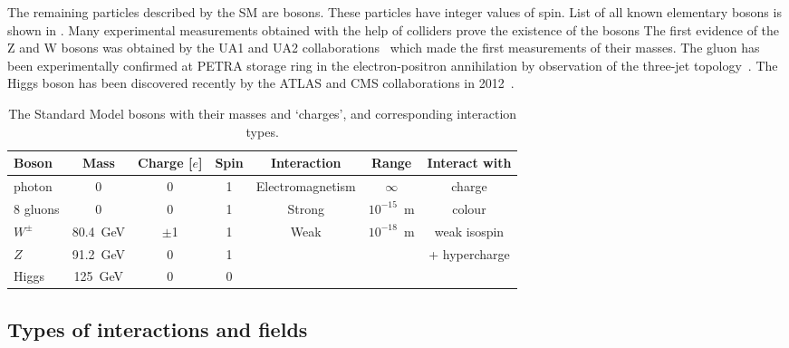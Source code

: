 The remaining particles described by the SM are bosons. These particles have integer values of spin.
List of all known elementary bosons is shown in .
Many experimental measurements obtained with the help of colliders prove the existence of the bosons
The first evidence of the Z and W bosons was obtained by the UA1 and UA2 collaborations~\cite{ARNISON1983103, BAGNAIA1983130}
which made the first measurements of their masses.
The gluon has been experimentally confirmed at PETRA storage ring in the electron-positron annihilation by observation of the three-jet topology~\cite{three_jet_event}.
The Higgs boson has been discovered recently by the ATLAS and CMS collaborations in 2012~\cite{Aad2012tfa, Chatrchyan2012ufa}.

\begin{table}[h!]
\begin{center}
{
\begin{tabular}{|l|c|c|c|c|c|c|}\cline{1-7}
 Boson & Mass &  Charge [$e$] & Spin  & Interaction & Range & Interact with \\ \hline
    photon  &  0  &  0 & 1 &  Electromagnetism & $ \infty $  &  charge \\ \hline
  8 gluons  &  0  &  0 & 1 &  Strong & $10^{-15}$~m &  colour \\ \hline 
    $W^{\pm}$   &  80.4~GeV  &  $\pm$1 & 1 &  \multirow{2}{*}{Weak}  & \multirow{2}{*}{$10^{-18}$~m} & weak isospin  \\
    $Z$   &  91.2~GeV  &  0 & 1 &  &  & + hypercharge \\ \hline
    Higgs   &  125~GeV  &  0 & 0 &  &  &   \\ 
\hline
\end{tabular}
}
\caption{\label{tab:bosons}The Standard Model bosons with their masses and `charges', and corresponding interaction types. }
\end{center}
\end{table}




\subsection{Types of interactions and fields}

